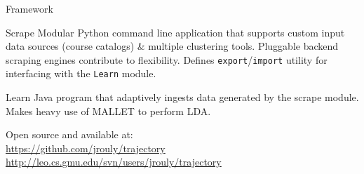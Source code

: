 \begin{frame}{Framework}

  \begin{block}{Scrape}
    Modular Python command line application that supports custom input
    data sources (course catalogs) \& multiple clustering tools.
    Pluggable backend scraping engines contribute to flexibility. Defines
    \texttt{export}/\texttt{import} utility for interfacing with the
    \texttt{Learn} module.
  \end{block}

  \vfill

  \begin{block}{Learn}
    Java program that adaptively ingests data generated by the scrape
    module. Makes heavy use of MALLET to perform LDA.
  \end{block}

  \vfill

  Open source and available at:\\
  \url{https://github.com/jrouly/trajectory}\\
  \url{http://leo.cs.gmu.edu/svn/users/jrouly/trajectory}

\end{frame}
